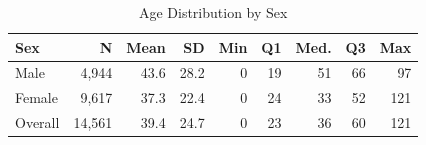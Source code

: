 \begin{table}[t]
\centering
\caption{Age Distribution by Sex}
\label{tab:age_summary}
\scriptsize
\begin{tabular}{@{}lrrrrrrrr@{}}
\toprule
\textbf{Sex} & \textbf{N} & \textbf{Mean} & \textbf{SD} & \textbf{Min} & \textbf{Q1} & \textbf{Med.} & \textbf{Q3} & \textbf{Max} \\
\midrule
    Male & 4,944 & 43.6 & 28.2 & 0 & 19 & 51 & 66 & 97 \\
    Female & 9,617 & 37.3 & 22.4 & 0 & 24 & 33 & 52 & 121 \\
    Overall & 14,561 & 39.4 & 24.7 & 0 & 23 & 36 & 60 & 121 \\
\bottomrule
\end{tabular}
\end{table}